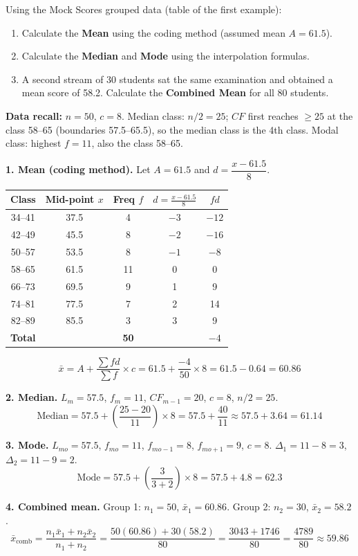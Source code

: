 \documentclass[11pt]{article}
\begin{document}
\begin{exoresolu}
Using the Mock Scores grouped data (table of the first example):
\begin{enumerate}
    \item Calculate the \textbf{Mean} using the coding method (assumed mean $A = 61.5$).
    \item Calculate the \textbf{Median} and \textbf{Mode} using the interpolation formulas.
    \item A second stream of 30 students sat the same examination and obtained a mean score of 58.2. Calculate the \textbf{Combined Mean} for all 80 students.
\end{enumerate}
\tcblower
\textbf{Data recall:} $n=50$, $c=8$. Median class: $n/2 = 25$; $CF$ first reaches $\ge 25$ at the class 58--65 (boundaries 57.5--65.5), so the median class is the 4th class. Modal class: highest $f = 11$, also the class 58--65.

\textbf{1. Mean (coding method).}
Let $A = 61.5$ and $d = \dfrac{x - 61.5}{8}$.

\begin{center}
\begin{tabular}{|c|c|c|c|c|}\hline
\rowcolor{popblueL}
Class & Mid-point $x$ & Freq $f$ & $d = \frac{x-61.5}{8}$ & $fd$ \\ \hline
34--41 & 37.5 & 4 & $-3$ & $-12$ \\ \hline
42--49 & 45.5 & 8 & $-2$ & $-16$ \\ \hline
50--57 & 53.5 & 8 & $-1$ & $-8$ \\ \hline
58--65 & 61.5 & 11 & 0 & 0 \\ \hline
66--73 & 69.5 & 9 & 1 & 9 \\ \hline
74--81 & 77.5 & 7 & 2 & 14 \\ \hline
82--89 & 85.5 & 3 & 3 & 9 \\ \hline
\textbf{Total} & & \textbf{50} & & \textbf{$-4$} \\ \hline
\end{tabular}
\end{center}

\[ \bar{x} = A + \frac{\sum fd}{\sum f} \times c = 61.5 + \frac{-4}{50} \times 8 = 61.5 - 0.64 = \mathbf{60.86} \]

\textbf{2. Median.}
$L_m = 57.5$, $f_m = 11$, $CF_{m-1} = 20$, $c = 8$, $n/2 = 25$.
\[ \text{Median} = 57.5 + \left( \frac{25 - 20}{11} \right) \times 8 = 57.5 + \frac{40}{11} \approx 57.5 + 3.64 = \mathbf{61.14} \]

\textbf{3. Mode.}
$L_{mo} = 57.5$, $f_{mo} = 11$, $f_{mo-1} = 8$, $f_{mo+1} = 9$, $c = 8$.
$\Delta_1 = 11 - 8 = 3$, \quad $\Delta_2 = 11 - 9 = 2$.
\[ \text{Mode} = 57.5 + \left( \frac{3}{3+2} \right) \times 8 = 57.5 + 4.8 = \mathbf{62.3} \]

\textbf{4. Combined mean.}
Group 1: $n_1 = 50$, $\bar{x}_1 = 60.86$. Group 2: $n_2 = 30$, $\bar{x}_2 = 58.2$.
\[ \bar{x}_{\text{comb}} = \frac{n_1\bar{x}_1 + n_2\bar{x}_2}{n_1+n_2} = \frac{50(60.86) + 30(58.2)}{80} = \frac{3043 + 1746}{80} = \frac{4789}{80} \approx \mathbf{59.86} \]
\end{exoresolu}
\end{document}
